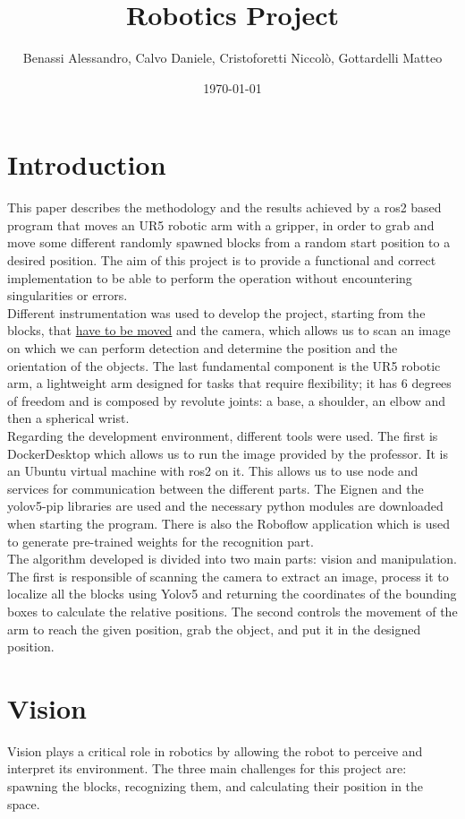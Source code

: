 \documentclass[12pt,a4paper]{article}
\title{Robotics Project}
\author{Benassi Alessandro, Calvo Daniele, Cristoforetti Niccolò, Gottardelli Matteo}
\date{\today}
\begin{document}
\maketitle
\tableofcontents
\newpage

\section{Introduction}\label{sec:intro}
This paper describes the methodology and the results achieved by a ros2 based program that moves an UR5 robotic arm with a gripper, in order to grab and move some different randomly spawned blocks from a random start position to a desired position. The aim of this project is to provide a functional and correct implementation to be able to perform the operation without encountering singularities or errors.\\
Different instrumentation was used to develop the project, starting from the blocks, that \uline{have to be moved} and the camera, which allows us to scan an image on which we can perform detection and determine the position and the orientation of the objects. The last fundamental component is the UR5 robotic arm, a lightweight arm designed for tasks that require flexibility; it has 6 degrees of freedom and is composed by revolute joints: a base, a shoulder, an elbow and then a spherical wrist.\\
Regarding the development environment, different tools were used. The first is DockerDesktop which allows us to run the image provided by the professor. It is an Ubuntu virtual machine with ros2 on it. This allows us to use node and services for communication between the different parts. The Eignen and the yolov5-pip libraries are used and the necessary python modules are downloaded when starting the program. There is also the Roboflow application which is used to generate pre-trained weights for the recognition part.\\ 
The algorithm developed is divided into two main parts: vision and manipulation. The first is responsible of scanning the camera to extract an image, process it to localize all the blocks using Yolov5 and returning the coordinates of the bounding boxes to calculate the relative positions. The second controls the movement of the arm to reach the given position, grab the object, and put it in the designed position.


\section{Vision}\label{sec:vision}
Vision plays a critical role in robotics by allowing the robot to perceive and interpret its environment. 
The three main challenges for this project are: spawning the blocks, recognizing them, and calculating their position in the space.
\end{document}
